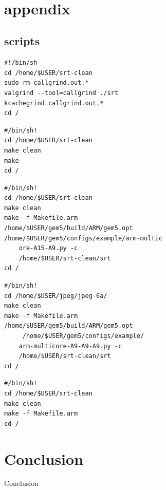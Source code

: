 \documentclass[journal]{IEEEtran}
\begin{document}
\

\section{appendix}
\subsection{scripts}
\begin{lstlisting}
#!/bin/sh
cd /home/$USER/srt-clean
sudo rm callgrind.out.*
valgrind --tool=callgrind ./srt
kcachegrind callgrind.out.*
cd /
\end{lstlisting}

\begin{lstlisting}
#/bin/sh!
cd /home/$USER/srt-clean
make clean
make
cd /
\end{lstlisting}

\begin{lstlisting}
#/bin/sh!
cd /home/$USER/srt-clean
make clean
make -f Makefile.arm
/home/$USER/gem5/build/ARM/gem5.opt
/home/$USER/gem5/configs/example/arm-multic
	ore-A15-A9.py -c
	/home/$USER/srt-clean/srt
cd /
\end{lstlisting}

\begin{lstlisting}
#/bin/sh!
cd /home/$USER/jpeg/jpeg-6a/
make clean
make -f Makefile.arm
/home/$USER/gem5/build/ARM/gem5.opt
	 /home/$USER/gem5/configs/example/
	arm-multicore-A9-A9-A9.py -c 
	/home/$USER/srt-clean/srt
cd /
\end{lstlisting}


\begin{lstlisting}
#/bin/sh!
cd /home/$USER/srt-clean
make clean
make -f Makefile.arm
cd /
\end{lstlisting}



\section{Conclusion}
Conclusion
\end{document}
